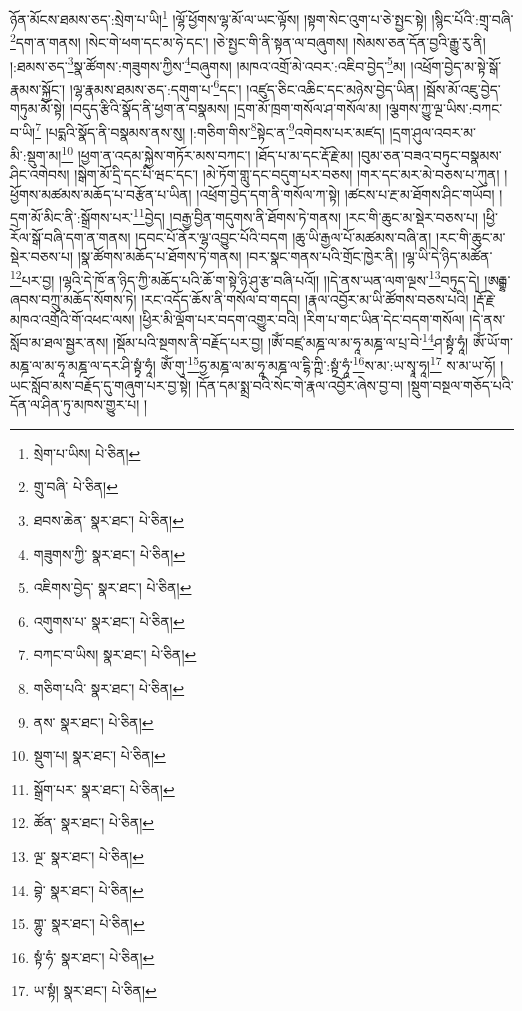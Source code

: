 ཉོན་མོངས་ཐམས་ཅད་:སྲེག་པ་ཡི།\footnote{སྲེག་པ་ཡིས།  པེ་ཅིན། } །ལྷོ་ཕྱོགས་ལྷ་མོ་ལ་ཡང་ལྟོས། །སྟག་སེང་འུག་པ་ཅེ་སྤྱང་སྟེ། །སྙིང་པོའི་:གྲྭ་བཞི་\footnote{གྲུ་བཞི་  པེ་ཅིན། }དག་ན་གནས། །སེང་གེ་ཕག་དང་མ་ཧེ་དང་། །ཅེ་སྤྱང་གི་ནི་སྟན་ལ་བཞུགས། །སེམས་ཅན་དོན་བྱའི་རྒྱུ་རུ་ནི། །:ཐམས་ཅད་\footnote{ཐབས་ཆེན་  སྣར་ཐང་།  པེ་ཅིན། }སྣ་ཚོགས་:གཟུགས་ཀྱིས་\footnote{གཟུགས་ཀྱི་  སྣར་ཐང་།  པེ་ཅིན། }བཞུགས། །མཁའ་འགྲོ་མེ་འབར་:འཇིབ་བྱེད་\footnote{འཇིགས་བྱེད་  སྣར་ཐང་།  པེ་ཅིན། }མ། །འཕྲོག་བྱེད་མ་སྟེ་སྒོ་རྣམས་སྐྱོང་། །ལྷ་རྣམས་ཐམས་ཅད་:དགུག་པ་\footnote{འགུགས་པ་  སྣར་ཐང་།  པེ་ཅིན། }དང་། །འཛུད་ཅིང་འཆིང་དང་མཉེས་བྱེད་ཡིན། །སྦོས་མོ་འཇུ་བྱེད་གཏུམ་མོ་སྟེ། །བདུད་རྩིའི་སྣོད་ནི་ཕྱག་ན་བསྣམས། །དྲག་མོ་ཁྲག་གསོལ་ཤ་གསོལ་མ། །ལྕགས་ཀྱུ་ལྔ་ཡིས་:བཀང་བ་ཡི།\footnote{བཀང་བ་ཡིས།  སྣར་ཐང་།  པེ་ཅིན། } །པདྨའི་སྣོད་ནི་བསྣམས་ནས་སུ། །:གཅིག་གིས་\footnote{གཅིག་པའི་  སྣར་ཐང་།  པེ་ཅིན། }སྟེང་ན་\footnote{ནས་  སྣར་ཐང་།  པེ་ཅིན། }འགེབས་པར་མཛད། །དྲག་ཤུལ་འབར་མ་མི་:སྡུག་མ།\footnote{སྡུག་པ།  སྣར་ཐང་།  པེ་ཅིན། } །ཕྱག་ན་འདམ་སྐྱེས་གཏོར་མས་བཀང་། །ཐོད་པ་མ་དང་རྡོ་རྗེ་མ། །བུམ་ཅན་བཟའ་བཏུང་བསྣམས་ཤིང་འགེབས། །སྒེག་མོ་དྲི་དང་པི་ཝང་དང་། །མེ་ཏོག་གླུ་དང་བདུག་པར་བཅས། །གར་དང་མར་མེ་བཅས་པ་ཀུན། །ཕྱོགས་མཚམས་མཆོད་པ་བརྩོན་པ་ཡིན། །འཕྲོག་བྱེད་དག་ནི་གསོལ་ཀ་སྟེ། །ཚངས་པ་རྔ་མ་ཐོགས་ཤིང་གཡོབ། །དྲག་མོ་མིང་ནི་:སྒྲོགས་པར་\footnote{སྒྲོག་པར་  སྣར་ཐང་།  པེ་ཅིན། }བྱེད། །བརྒྱ་བྱིན་གདུགས་ནི་ཐོགས་ཏེ་གནས། །རང་གི་ཆུང་མ་སྡེར་བཅས་པ། །ཕྱི་རོལ་སྒོ་བཞི་དག་ན་གནས། །དབང་པོ་ནོར་ལྷ་འབྱུང་པོའི་བདག །ཆུ་ཡི་རྒྱལ་པོ་མཚམས་བཞི་ན། །རང་གི་ཆུང་མ་སྡེར་བཅས་པ། །སྣ་ཚོགས་མཆོད་པ་ཐོགས་ཏེ་གནས། །བར་སྣང་གནས་པའི་གྲོང་ཁྱེར་ནི། །ལྷ་ཡི་དེ་ཉིད་མཚོན་\footnote{ཚོན་  སྣར་ཐང་།  པེ་ཅིན། }པར་བྱ། །ལྷའི་དེ་ཁོ་ན་ཉིད་ཀྱི་མཆོད་པའི་ཆོ་ག་སྟེ་ཉི་ཤུ་རྩ་བཞི་པའོ།། །།དེ་ནས་ཡན་ལག་ལྔས་\footnote{ལྔ་  སྣར་ཐང་།  པེ་ཅིན། }བཏུད་དེ། །ཨརྒྷ་ཞབས་བཀྲུ་མཆོད་སོགས་ཏེ། །རང་འདོད་ཆོས་ནི་གསོལ་བ་གདབ། །རྣལ་འབྱོར་མ་ཡི་ཚོགས་བཅས་པའི། །རྡོ་རྗེ་མཁའ་འགྲོའི་གོ་འཕང་ལས། །ཕྱིར་མི་ལྡོག་པར་བདག་འགྱུར་བའི། །རིག་པ་གང་ཡིན་དེང་བདག་གསོལ། །དེ་ནས་སློབ་མ་ཐལ་སྦྱར་ནས། །སྡོམ་པའི་སྔགས་ནི་བརྗོད་པར་བྱ། །ཨོཾ་བཛྲ་མཎྜ་ལ་མ་ཧཱ་མཎྜ་ལ་པྲ་བེ་\footnote{བྷེ་  སྣར་ཐང་།  པེ་ཅིན། }ཤ་སྟྭཾ་ཧཱཾ། ཨོཾ་ཡོ་ག་མཎྜ་ལ་མ་ཧཱ་མཎྜ་ལ་དར་ཤི་སྟྭཾ་ཧཱཾ། ཨོཾ་གུ་\footnote{གྷུ་  སྣར་ཐང་།  པེ་ཅིན། }ཧྱ་མཎྜ་ལ་མ་ཧཱ་མཎྜ་ལ་དྷི་ཀྵི་:སྟྭཾ་ཧཱཾ་\footnote{སྟཾ་ཧཾ་  སྣར་ཐང་།  པེ་ཅིན། }ས་མ་:ཡ་སྭཱ་ཧཱ།\footnote{ཡ་སྟཾ།  སྣར་ཐང་།  པེ་ཅིན། } ས་མ་ཡ་ཧོ། །ཡང་སློབ་མས་བརྗོད་དུ་གཞུག་པར་བྱ་སྟེ། །དོན་དམ་སྨྲ་བའི་སེང་གེ་རྣལ་འབྱོར་ཞེས་བྱ་བ། །སྡུག་བསྔལ་གཅོད་པའི་དོན་ལ་ཤིན་ཏུ་མཁས་གྱུར་པ། །
